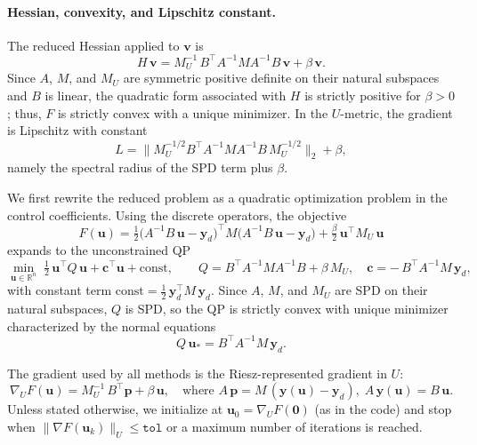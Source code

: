 \documentclass[11pt,a4paper]{article}
\begin{document}
\paragraph{Hessian, convexity, and Lipschitz constant.} The reduced Hessian applied to \(\mathbf{v}\) is
\begin{equation}
  H\, \mathbf{v} = M_U^{-1}\, B^\top A^{-1} M A^{-1} B\, \mathbf{v} + \beta\, \mathbf{v}.
\end{equation}
Since \(A\), \(M\), and \(M_U\) are symmetric positive definite on their natural subspaces and \(B\) is linear, the quadratic form associated with \(H\) is strictly positive for \(\beta>0\); thus, \(F\) is strictly convex with a unique minimizer. In the \(U\)-metric, the gradient is Lipschitz with constant
\begin{equation}
  L = \big\| M_U^{-1/2} B^\top A^{-1} M A^{-1} B\, M_U^{-1/2} \big\|_2 + \beta,
\end{equation}
namely the spectral radius of the SPD term plus \(\beta\).


We first rewrite the reduced problem as a quadratic optimization problem in the control coefficients. Using the discrete operators, the objective
\[
  F(\mathbf{u}) = \tfrac12 \big(A^{-1} B\, \mathbf{u} - \mathbf{y}_d\big)^\top M \big(A^{-1} B\, \mathbf{u} - \mathbf{y}_d\big) + \tfrac{\beta}{2}\, \mathbf{u}^\top M_U\, \mathbf{u}
\]
expands to the unconstrained QP
\begin{equation}
  \min_{\mathbf{u}\in\mathbb{R}^n} \; \tfrac12\, \mathbf{u}^\top Q\, \mathbf{u} + \mathbf{c}^\top \mathbf{u} + \text{const},
  \qquad Q = B^\top A^{-1} M A^{-1} B + \beta\, M_U,\quad \mathbf{c} = -\, B^\top A^{-1} M\, \mathbf{y}_d,
\end{equation}
with constant term $\text{const} = \tfrac12\, \mathbf{y}_d^\top M\, \mathbf{y}_d$. Since $A$, $M$, and $M_U$ are SPD on their natural subspaces, $Q$ is SPD, so the QP is strictly convex with unique minimizer characterized by the normal equations
\begin{equation}
  Q\, \mathbf{u}_* = B^\top A^{-1} M\, \mathbf{y}_d.
\end{equation}

The gradient used by all methods is the Riesz-represented gradient in \(U\):
\begin{equation}
  \nabla_U F(\mathbf{u}) = M_U^{-1}\, B^\top \mathbf{p} + \beta\, \mathbf{u}, \quad \text{where } A\, \mathbf{p} = M\, (\mathbf{y}(\mathbf{u}) - \mathbf{y}_d),\; A\, \mathbf{y}(\mathbf{u}) = B\, \mathbf{u}.
\end{equation}
Unless stated otherwise, we initialize at \(\mathbf{u}_0 = \nabla_U F(\mathbf{0})\) (as in the code) and stop when \(\|\nabla F(\mathbf{u}_k)\|_U \le \texttt{tol}\) or a maximum number of iterations is reached.
\end{document}
